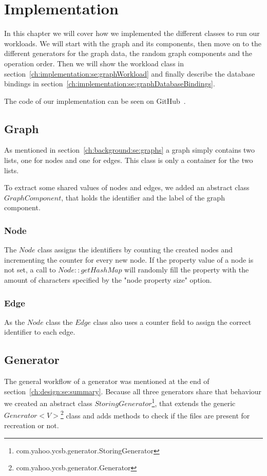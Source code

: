 \chapter{Implementation}
\label{ch:implementation}
In this chapter we will cover how we implemented the different classes to run our workloads.
We will start with the graph and its components,
then move on to the different generators for the graph data,
the random graph components and the operation order.
Then we will show the workload class in section~\ref{ch:implementation:se:graphWorkload} and finally describe the database bindings in section~\ref{ch:implementation:se:graphDatabaseBindings}.

The code of our implementation can be seen on GitHub~\cite{Navolskyi2017}.


\section{Graph}
As mentioned in section~\ref{ch:background:se:graphs} a graph simply contains two lists,
one for nodes and one for edges.
This class is only a container for the two lists.

To extract some shared values of nodes and edges,
we added an abstract class $ GraphComponent $,
that holds the identifier and the label of the graph component.

\subsection{Node}
The $ Node $ class assigns the identifiers by counting the created nodes and incrementing the counter for every new node.
If the property value of a node is not set,
a call to $ Node::getHashMap $ will randomly fill the property with the amount of characters specified by the "node property size" option.

\subsection{Edge}
As the $ Node $ class the $ Edge $ class also uses a counter field to assign the correct identifier to each edge.

\section{Generator}
\label{ch:implementation:se:generator}
The general workflow of a generator was mentioned at the end of section~\ref{ch:design:se:summary}.
Because all three generators share that behaviour we created an abstract class $ StoringGenerator $\footnote{com.yahoo.ycsb.generator.StoringGenerator},
that extends the generic $ Generator<V> $\footnote{com.yahoo.ycsb.generator.Generator} class and adds methods to check if the files are present for recreation or not.

